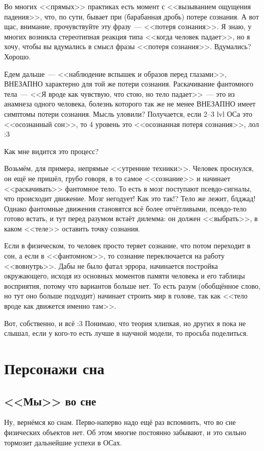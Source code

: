 \documentclass[a4paper,14pt,oneside]{memoir}
\begin{document}
Во многих <<прямых>> практиках есть момент с <<вызыванием ощущения падения>>, что, по сути, бывает при (барабанная дробь) потере сознания. А вот щас, внимание, прочувствуйте эту фразу~--- <<потеря сознания>>. Я знаю, у многих возникла стереотипная реакция типа <<когда человек падает>>, но я хочу, чтобы вы вдумались в смысл фразы <<потеря сознания>>. Вдумались? Хорошо.

Едем дальше~--- <<наблюдение вспышек и образов перед глазами>>, ВНЕЗАПНО характерно для той же потери сознания. Раскачивание фантомного тела~--- <<Я вроде как чувствую, что стою, но тело падает>>~--- это из анамнеза одного человека, болезнь которого так же не менее ВНЕЗАПНО имеет симптомы потери сознания. Мысль уловили? Получается, если 2--3 lvl ОСа это <<осознанный сон>>, то 4  уровень это <<осознанная потеря сознания>>, лол :3 

Как мне видится это процесс? 

Возьмём, для примера, непрямые <<утренние техники>>. Человек проснулся, он ещё не пришёл, грубо говоря, в то самое <<сознание>> и начинает <<раскачивать>> фантомное тело. То есть в мозг поступают псевдо-сигналы, что происходит движение. Мозг негодует! Как это так!? Тело же лежит, блджад! Однако фантомные движения становятся всё более отчётливыми, псевдо-тело готово встать, и тут перед разумом встаёт дилемма: он должен <<выбрать>>, в каком <<теле>> оставить точку сознания.
 
Если в физическом, то человек просто теряет сознание, что потом переходит в сон, а если в  <<фантомном>>, то сознание переключается на работу <<вовнутрь>>. Дабы не было фатал эррора, начинается постройка окружающего, исходя из основных моментов памяти человека и его таблицы восприятия, потому что вариантов больше нет. То есть разум (обобщённое слово, но тут оно больше подходит) начинает строить мир в голове, так как <<тело вроде как движется именно там>>.

Вот, собственно, и всё :3 Понимаю, что теория хлипкая, но других я пока не слышал, если у кого-то есть лучше в научной модели, то просьба поделиться.




\chapter{Персонажи сна}

\section{<<Мы>> во сне}
Ну, вернёмся ко снам. Перво-наперво надо ещё раз вспомнить, что во сне физических объектов нет. Об этом многие постоянно забывают, и это сильно тормозит дальнейшие успехи в ОСах. 
\end{document}
